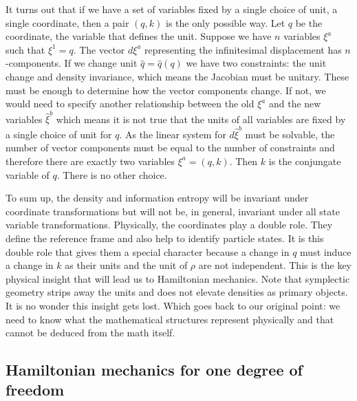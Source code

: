 \documentclass[11pt]{elsarticle}
\begin{document}
It turns out that if we have a set of variables fixed by a single choice of unit, a single coordinate, then a pair $(q, k)$ is the only possible way. Let $q$ be the coordinate, the variable that defines the unit. Suppose we have $n$ variables $\xi^a$ such that $\xi^1 = q$. The vector $d\xi^a$ representing the infinitesimal displacement has $n$-components. If we change unit $\hat{q}=\hat{q}(q)$ we have two constraints: the unit change and density invariance, which means the Jacobian must be unitary. These must be enough to determine how the vector components change. If not, we would need to specify another relationship between the old $\xi^a$ and the new variables $\hat{\xi}^b$ which means it is not true that the units of all variables are fixed by a single choice of unit for $q$. As the linear system for $d\hat{\xi}^b$ must be solvable, the number of vector components must be equal to the number of constraints and therefore there are exactly two variables $\xi^a = (q, k)$. Then $k$ is the conjungate variable of $q$. There is no other choice.

To sum up, the density and information entropy will be invariant under coordinate transformations but will not be, in general, invariant under all state variable transformations. Physically, the coordinates play a double role. They define the reference frame and also help to identify particle states. It is this double role that gives them a special character because a change in $q$ must induce a change in $k$ as their units and the unit of $\rho$ are not independent. This is the key physical insight that will lead us to Hamiltonian mechanics. Note that symplectic geometry strips away the units and does not elevate densities as primary objects. It is no wonder this insight gets lost. Which goes back to our original point: we need to know what the mathematical structures represent physically and that cannot be deduced from the math itself.


\subsection*{Hamiltonian mechanics for one degree of freedom}
\end{document}
